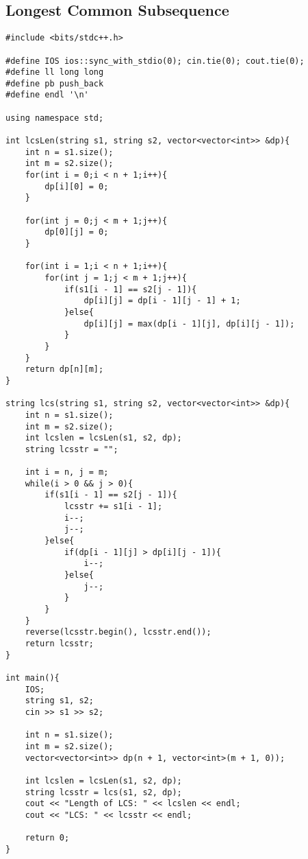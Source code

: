 \documentclass[12pt, a4paper]{article}
\begin{document}
\subsection{Longest Common Subsequence}
\begin{lstlisting}
#include <bits/stdc++.h>

#define IOS ios::sync_with_stdio(0); cin.tie(0); cout.tie(0);
#define ll long long
#define pb push_back
#define endl '\n'

using namespace std;

int lcsLen(string s1, string s2, vector<vector<int>> &dp){
    int n = s1.size();
    int m = s2.size();
    for(int i = 0;i < n + 1;i++){
        dp[i][0] = 0;
    }

    for(int j = 0;j < m + 1;j++){
        dp[0][j] = 0;
    }

    for(int i = 1;i < n + 1;i++){
        for(int j = 1;j < m + 1;j++){
            if(s1[i - 1] == s2[j - 1]){
                dp[i][j] = dp[i - 1][j - 1] + 1;
            }else{
                dp[i][j] = max(dp[i - 1][j], dp[i][j - 1]);
            }
        }
    }
    return dp[n][m];
}

string lcs(string s1, string s2, vector<vector<int>> &dp){
    int n = s1.size();
    int m = s2.size();
    int lcslen = lcsLen(s1, s2, dp);
    string lcsstr = "";

    int i = n, j = m;
    while(i > 0 && j > 0){
        if(s1[i - 1] == s2[j - 1]){
            lcsstr += s1[i - 1];
            i--;
            j--;
        }else{
            if(dp[i - 1][j] > dp[i][j - 1]){
                i--;
            }else{
                j--;
            }
        }
    }
    reverse(lcsstr.begin(), lcsstr.end());
    return lcsstr;
}

int main(){
    IOS;
    string s1, s2;
    cin >> s1 >> s2;

    int n = s1.size();
    int m = s2.size();
    vector<vector<int>> dp(n + 1, vector<int>(m + 1, 0));

    int lcslen = lcsLen(s1, s2, dp);
    string lcsstr = lcs(s1, s2, dp);
    cout << "Length of LCS: " << lcslen << endl;
    cout << "LCS: " << lcsstr << endl;

    return 0;
}
\end{lstlisting}
\end{document}
